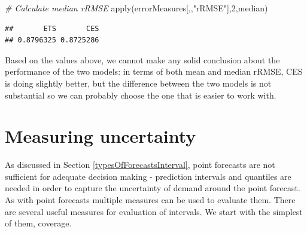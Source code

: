 \documentclass[
]{book}
\newenvironment{Shaded}{\begin{snugshade}}{\end{snugshade}}
\newcommand{\CommentTok}[1]{\textcolor[rgb]{0.56,0.35,0.01}{\textit{#1}}}
\newcommand{\DecValTok}[1]{\textcolor[rgb]{0.00,0.00,0.81}{#1}}
\newcommand{\FunctionTok}[1]{\textcolor[rgb]{0.00,0.00,0.00}{#1}}
\newcommand{\NormalTok}[1]{#1}
\newcommand{\StringTok}[1]{\textcolor[rgb]{0.31,0.60,0.02}{#1}}
\theoremstyle{definition}
\theoremstyle{definition}
\theoremstyle{definition}
\theoremstyle{definition}
\theoremstyle{remark}
\begin{document}
\begin{Shaded}
\begin{Highlighting}[]
\CommentTok{\# Calculate median rRMSE}
\FunctionTok{apply}\NormalTok{(errorMeasures[,,}\StringTok{"rRMSE"}\NormalTok{],}\DecValTok{2}\NormalTok{,median)}
\end{Highlighting}
\end{Shaded}

\begin{verbatim}
##       ETS       CES 
## 0.8796325 0.8725286
\end{verbatim}

Based on the values above, we cannot make any solid conclusion about the performance of the two models: in terms of both mean and median rRMSE, CES is doing slightly better, but the difference between the two models is not substantial so we can probably choose the one that is easier to work with.

\hypertarget{uncertainty}{%
\section{Measuring uncertainty}\label{uncertainty}}

As discussed in Section \ref{typesOfForecastsInterval}, point forecasts are not sufficient for adequate decision making - prediction intervals and quantiles are needed in order to capture the uncertainty of demand around the point forecast. As with point forecasts multiple measures can be used to evaluate them. There are several useful measures for evaluation of intervals. We start with the simplest of them, coverage.
\end{document}
